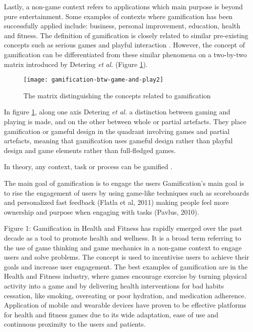 Lastly, a non-game context refers to applications which main purpose is beyond pure entertainment. Some examples of contexts where gamification has been successfully applied include: business, personal improvement, education, health and fitness. %
The definition of gamification is closely related to similar pre-existing concepts such as serious games and playful interaction \cite{deterding2011game}. However, the concept of gamification can be differentiated from these similar phenomena on a two-by-two matrix introduced by Detering \textit{et al.} (Figure \ref{fig:mesh1}). 

\begin{figure}[h]
    \centering
    \texttt{[image: gamification-btw-game-and-play2]}
    \caption{The matrix distinguishing the concepts related to gamification}
    \label{fig:mesh1}
\end{figure}
In figure \ref{fig:mesh1}, along one axis Detering \textit{et al.} a distinction between gaming and playing is made, and on the other between whole or partial artefacts. They place gamification or gameful design in the quadrant involving games and partial artefacts, meaning that gamification uses gameful design rather than playful design and game elements rather than full-fledged games. 
 
 
% 

In theory, any context, task or process can be gamified \cite{muntean2011raising}. %

The main goal of gamification is to engage the users 
Gamification’s main goal is to rise the engagement of users by using game-like techniques such as
scoreboards and personalized fast feedback (Flatla et al, 2011) making people feel more ownership
and purpose when engaging with tasks (Pavlus, 2010). 
\cite{burke2016gamify}

Figure 1: 
Gamification in Health and Fitness has rapidly emerged over the past decade as a tool to promote health and wellness. It is a broad term referring to the use of game thinking and game mechanics in a non-game context to engage users and solve problems. The concept is used to incentivise users to achieve their goals and increase user engagement. The best examples of gamification are in the Health and Fitness industry, where games encourage exercise by turning physical activity into a game and by delivering health interventions for bad habits cessation, like smoking, overeating or poor hydration, and medication adherence. Application of mobile and wearable devices have proven to be effective platforms for health and fitness games due to its wide adaptation, ease of use and continuous proximity to the users and patients.



